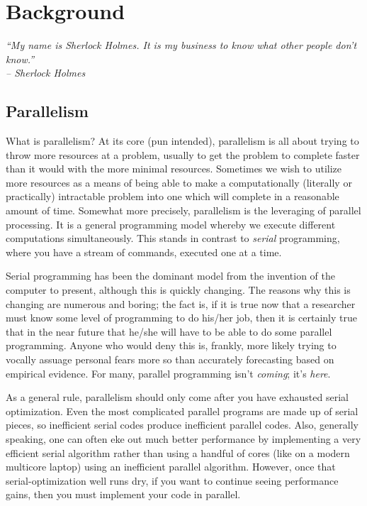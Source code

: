 \chapter{Background}
\label{sec:bg}


{\it
``My name is Sherlock Holmes. It is my business to know what other people
don't know.'' \\
\--- Sherlock Holmes
}


\section{Parallelism}
What is parallelism? At its core (pun intended), parallelism is all about
trying to throw more resources at a problem, usually to get the problem to
complete faster than it would with the more minimal resources. Sometimes
we wish to utilize more resources as a means of being able to make a
computationally (literally or practically) intractable problem into one which
will complete in a reasonable amount of time. Somewhat more precisely,
parallelism is the leveraging of parallel processing. It is a general
programming model whereby we execute different computations simultaneously.
This stands in contrast to \emph{serial} programming, where you have a stream
of commands, executed one at a time.

Serial programming has been the dominant model from the invention of the
computer to present, although this is quickly changing. The reasons why
this is changing are numerous and boring; the fact is, if it is true now
that a researcher must know some level of programming to do his/her job,
then it is certainly true that in the near future that he/she will have to
be able to do some parallel programming. Anyone who would deny this is,
frankly, more likely trying to vocally assuage personal fears more so than
accurately forecasting based on empirical evidence. For many, parallel
programming isn't \emph{coming}; it's \emph{here}.  

As a general rule, parallelism should only come after you have exhausted
serial optimization. Even the most complicated parallel programs are made
up of serial pieces, so inefficient serial codes produce inefficient parallel
codes. Also, generally speaking, one can often eke out much better performance
by implementing a very efficient serial algorithm rather than using a handful
of cores (like on a modern multicore laptop) using an inefficient parallel
algorithm. However, once that serial-optimization well runs dry, if you want
to continue seeing performance gains, then you must implement your code in
parallel.  

